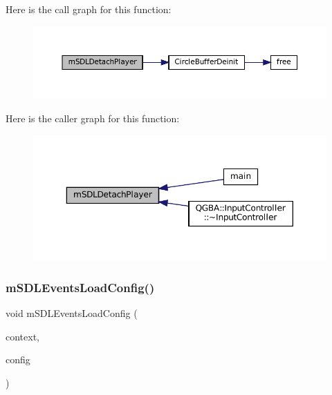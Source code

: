 Here is the call graph for this function\+:
\nopagebreak
\begin{figure}[H]
\begin{center}
\leavevmode
\includegraphics[width=350pt]{sdl-events_8c_a64e440a5ad2a51018e3fe003e1b2615e_cgraph}
\end{center}
\end{figure}
Here is the caller graph for this function\+:
\nopagebreak
\begin{figure}[H]
\begin{center}
\leavevmode
\includegraphics[width=350pt]{sdl-events_8c_a64e440a5ad2a51018e3fe003e1b2615e_icgraph}
\end{center}
\end{figure}
\mbox{\label{sdl-events_8c_aef6ce1dc9e5c4e9541747a55dc1ee383}} 
\subsubsection{\texorpdfstring{m\+S\+D\+L\+Events\+Load\+Config()}{mSDLEventsLoadConfig()}}
{\footnotesize\ttfamily void m\+S\+D\+L\+Events\+Load\+Config (\begin{DoxyParamCaption}\item[{struct \mbox{\hyperlink{sdl-events_8h_structm_s_d_l_events}{m\+S\+D\+L\+Events}} $\ast$}]{context,  }\item[{const struct Configuration $\ast$}]{config }\end{DoxyParamCaption})}


